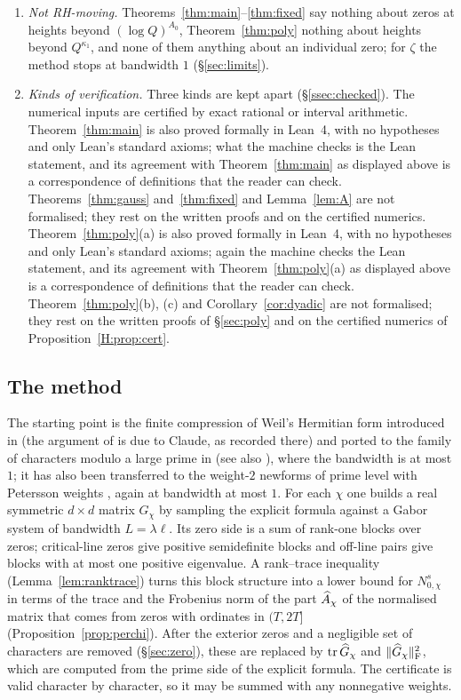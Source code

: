 \documentclass[11pt]{amsart}
\theoremstyle{definition}
\theoremstyle{remark}
\numberwithin{equation}{section}
\begin{document}
\begin{enumerate}[label=(\arabic*),leftmargin=*]
\item \emph{Not RH-moving.} Theorems~\ref{thm:main}--\ref{thm:fixed} say nothing about zeros at heights beyond $(\log Q)^{A_0}$, Theorem~\ref{thm:poly} nothing about heights beyond $Q^{\kappa_1}$, and none of them anything about an individual zero; for $\zeta$ the method stops at bandwidth $1$ (\S\ref{sec:limits}).
\item \emph{Kinds of verification.} Three kinds are kept apart (\S\ref{ssec:checked}). The numerical inputs are certified by exact rational or interval arithmetic. Theorem~\ref{thm:main} is also proved formally in Lean~4, with no hypotheses and only Lean's standard axioms; what the machine checks is the Lean statement, and its agreement with Theorem~\ref{thm:main} as displayed above is a correspondence of definitions that the reader can check. Theorems~\ref{thm:gauss} and~\ref{thm:fixed} and Lemma~\ref{lem:A} are not formalised; they rest on the written proofs and on the certified numerics. Theorem~\ref{thm:poly}(a) is also proved formally in Lean~4, with no hypotheses and only Lean's standard axioms; again the machine checks the Lean statement, and its agreement with Theorem~\ref{thm:poly}(a) as displayed above is a correspondence of definitions that the reader can check. Theorem~\ref{thm:poly}(b), (c) and Corollary~\ref{cor:dyadic} are not formalised; they rest on the written proofs of \S\ref{sec:poly} and on the certified numerics of Proposition~\ref{H:prop:cert}.
\end{enumerate}

\subsection{The method}\label{sec:method}
The starting point is the finite compression of Weil's Hermitian form introduced in \cite{AF26} (the argument of \cite{AF26} is due to Claude, as recorded there) and ported to the family of characters modulo a large prime in \cite{HY26,HY26b} (see also \cite{Pru26}), where the bandwidth is at most $1$; it has also been transferred to the weight-$2$ newforms of prime level with Petersson weights \cite{Fab26}, again at bandwidth at most $1$. For each $\chi$ one builds a real symmetric $d\times d$ matrix $G_\chi$ by sampling the explicit formula against a Gabor system of bandwidth $L=\lambda\ell$. Its zero side is a sum of rank-one blocks over zeros; critical-line zeros give positive semidefinite blocks and off-line pairs give blocks with at most one positive eigenvalue. A rank--trace inequality (Lemma~\ref{lem:ranktrace}) turns this block structure into a lower bound for $N^s_{0,\chi}$ in terms of the trace and the Frobenius norm of the part $\widehat A_\chi$ of the normalised matrix that comes from zeros with ordinates in $(T,2T]$ (Proposition~\ref{prop:perchi}). After the exterior zeros and a negligible set of characters are removed (\S\ref{sec:zero}), these are replaced by $\operatorname{tr}\widehat G_\chi$ and $\|\widehat G_\chi\|_\mathrm F^2$, which are computed from the prime side of the explicit formula. The certificate is valid character by character, so it may be summed with any nonnegative weights.
\end{document}
